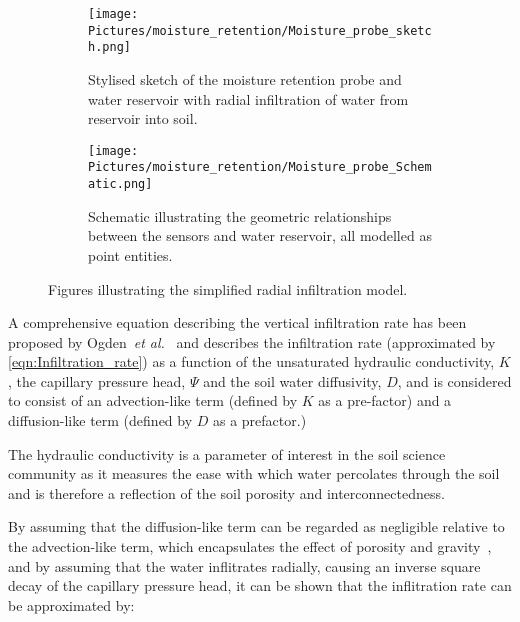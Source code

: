 \begin{figure*}[h!]
\centering
\begin{subfigure}[b]{.75\textwidth}
  \centering
  \texttt{[image: Pictures/moisture\_retention/Moisture\_probe\_sketch.png]}
  \captionsetup{justification = centering}
  \caption{Stylised sketch of the moisture retention probe and water reservoir with radial infiltration of water from reservoir into soil.}
  \label{fig:moisture_retention_sketch}
\end{subfigure}%
\vspace{10mm}
\begin{subfigure}[b]{.75\textwidth}
  \centering
  \texttt{[image: Pictures/moisture\_retention/Moisture\_probe\_Schematic.png]}
  \captionsetup{justification = centering}
  \caption{Schematic illustrating the geometric relationships between the sensors and water reservoir, all modelled as point entities.}
  \label{fig:moisture_retention_schematic}
\end{subfigure}
\captionsetup{justification = centering}
\caption{Figures illustrating the simplified radial infiltration model.}
\label{fig:Moiture_retention_Radial_infiltration}
\end{figure*}

A comprehensive equation describing the vertical infiltration rate has been proposed by Ogden~\textit{et al.}~\cite{soilmoisturevelocityogdenetal2017} and describes the infiltration rate (approximated by \cref{eqn:Infiltration_rate}) as a function of the unsaturated hydraulic conductivity, $K$, the capillary pressure head, $\Psi$ and the soil water diffusivity, $D$, and is considered to consist of an advection-like term (defined by $K$ as a pre-factor) and a diffusion-like term (defined by $D$ as a prefactor.)

The hydraulic conductivity is a parameter of interest in the soil science community as it measures the ease with which water percolates through the soil and is therefore a reflection of the soil porosity and interconnectedness. 

By assuming that the diffusion-like term can be regarded as negligible relative to the advection-like term, which encapsulates the effect of porosity and gravity~\cite{soilmoisturevelocityogdenetal2017}, and by assuming that the water inflitrates radially, causing an inverse square decay of the capillary pressure head, it can be shown that the inflitration rate can be approximated by:

